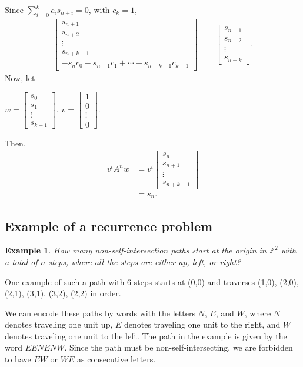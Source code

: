 \documentclass[11pt]{article}
\newtheorem{example}[theorem]{Example}
\begin{document}
Since $\displaystyle\sum_{i=0}^{k}{c_{i}s_{n+i}}=0$, with $c_{k}=1$,
\begin{align*}
\begin{bmatrix}
s_{n+1} \\ s_{n+2} \\ \vdots \\ s_{n+k-1} \\
-s_{n}c_{0}-s_{n+1}c_{1}+\cdots-s_{n+k-1}c_{k-1}
\end{bmatrix}
&=
\begin{bmatrix}s_{n+1}\\ s_{n+2}\\ \vdots \\ s_{n+k}
\end{bmatrix}.
\end{align*}
Now, let 
\begin{center}
$w=\begin{bmatrix} s_{0} \\ s_{1} \\ \vdots \\ s_{k-1}\end{bmatrix}$, $v=\begin{bmatrix} 1 \\ 0 \\ \vdots \\ 0\end{bmatrix}$.
\end{center}
Then, 
\begin{align*}
v^{t}A^{n}w&=v^{t}\begin{bmatrix} s_{n} \\ s_{n+1} \\ \vdots \\ s_{n+k-1}\end{bmatrix}\\
&= s_{n}.
\end{align*}
\subsection{Example of a recurrence problem}
\begin{example}
How many non-self-intersection paths start at the origin in $\mathbb{Z}^2$ with a total of $n$ steps, where all the steps are either up, left, or right?
\end{example}

One example of such a path with 6 steps starts at (0,0) and traverses (1,0), (2,0), (2,1), (3,1), (3,2), (2,2) in order. 

We can encode these paths by words with the letters $N$, $E$, and $W$, where $N$ denotes traveling one unit up, $E$ denotes traveling one unit to the right, and $W$ denotes traveling one unit to the left. The path in the example is given by the word $EENENW$. Since the path must be non-self-intersecting, we are forbidden to have $EW$ or $WE$ as consecutive letters.
\end{document}
